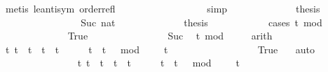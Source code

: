 \begin{isabellebody}
\ {\isacharparenleft}metis\ le{\isacharunderscore}antisym\ order{\isacharunderscore}refl{\isacharparenright}\isanewline
\ \ \ \ \ \ \ \ \ \ \isamarkupfalse%
\ \isamarkupfalse%
\ {\isacartoucheopen}{\isachardot}{\isachardot}{\isachardot}\ {\isacharequal}\ {}{\isacartoucheclose}\ \isamarkupfalse%
\ simp\isanewline
\ \ \ \ \ \ \ \ \ \ \isamarkupfalse%
\ \isamarkupfalse%
\ {\isacharquery}thesis\ \isacommand{{\isachardot}}\isamarkupfalse%
\ \isanewline
\ \ \ \ \ \ \isamarkupfalse%
\isanewline
\ \ \ \ \ \ \ \ \isamarkupfalse%
\ {\isacharparenleft}Suc\ nat{\isacharparenright}\isanewline
\ \ \ \ \ \ \ \ \ \ \isamarkupfalse%
\ \isamarkupfalse%
\ {\isacharquery}thesis\isanewline
\ \ \ \ \ \ \ \ \ \ \isamarkupfalse%
\ {\isacharparenleft}cases\ {\isacartoucheopen}{\isacharparenleft}t\ mod\ {}\ {\isacharequal}\ {}{\isacartoucheclose}{\isacharparenright}\isanewline
\ \ \ \ \ \ \ \ \ \ \ \ \isamarkupfalse%
\ True\isanewline
\ \ \ \ \ \ \ \ \ \ \ \ \ \ \isamarkupfalse%
\ Suc\ \isamarkupfalse%
\ {\isacartoucheopen}t\ mod\ {}\ {\isasymnoteq}\ {}{\isacartoucheclose}\ \isamarkupfalse%
\ arith\ \isanewline
\ \ \ \ \ \ \ \ \ \ \ \ \ \ \isamarkupfalse%
\ {\isacartoucheopen}{\isacharbraceleft}t{\isachardot}\ {\isacharparenleft}t\ {\isacharequal}\ t\ {\isasymor}\ t\ {\isacharequal}\ t\ {\isacharplus}\ {}{\isacharparenright}\ {\isasymand}\ {}\ {\isasymle}\ t\ {\isasymand}\ {\isacharparenleft}t\ {\isacharminus}\ {}{\isacharparenright}\ mod\ {}\ {\isacharequal}\ {}{\isacharbraceright}\ {\isacharequal}\ {\isacharbraceleft}t\isanewline
\ \ \ \ \ \ \ \ \ \ \ \ \ \ \ \ \isamarkupfalse%
\ True\ \ \isamarkupfalse%
\ auto\isanewline
\ \ \ \ \ \ \ \ \ \ \ \ \ \ \isamarkupfalse%
\ {\isacartoucheopen}{\isacharbraceleft}t{\isachardot}\ t\ {\isasymle}\ t\ {\isasymand}\ t\ {\isacharless}\ t\ {\isacharplus}\ {}\ {\isasymand}\ {}\ {\isasymle}\ t\ {\isasymand}\ {\isacharparenleft}t\ {\isacharminus}\ {}{\isacharparenright}\ mod\ {}\ {\isacharequal}\ {}{\isacharbraceright}\ {\isacharequal}\ {\isacharbraceleft}t\isanewline

\end{isabellebody}
